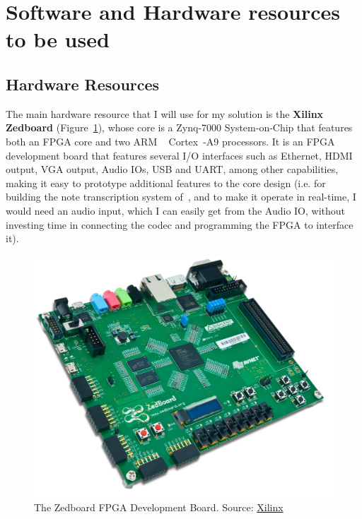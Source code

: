 \section{Software and Hardware resources to be used}\label{sec:wp_sh}

\subsection{Hardware Resources}
The main hardware resource that I will use for my solution is the \textbf{Xilinx\textregistered~ Zedboard} (Figure~\ref{fig:zedboard}), whose core is a Zynq-7000 System-on-Chip that features both an FPGA core and two ARM \textregistered~ Cortex\texttrademark~-A9 processors. It is an FPGA development board that features several I/O interfaces such as Ethernet, HDMI output, VGA output, Audio IOs, USB and UART, among other capabilities, making it easy to prototype additional features to the core design (i.e. for building the note transcription system of~\cite{Bock12}, and to make it operate in real-time, I would need an audio input, which I can easily get from the Audio IO, without investing time in connecting the codec and programming the FPGA to interface it).

\begin{figure}
    \centering
    \includegraphics[width=\linewidth]{figures/zedboard.jpg}
    \caption{The Zedboard FPGA Development Board. Source: \href{http://www.xilinx.com}{Xilinx}}
    \label{fig:zedboard}
\end{figure}

